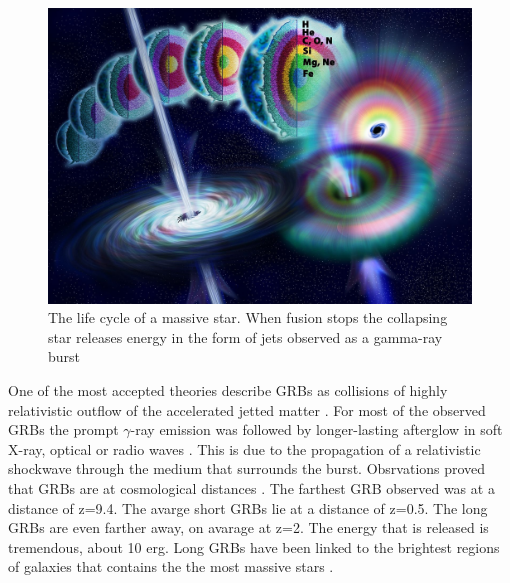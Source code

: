\documentclass[12pt, a4paper,titlepage]{article}
\numberwithin{equation}{section}
\numberwithin{figure}{section}
\begin{document}
\begin{figure}[H]
\centering
\includegraphics[width=130.0mm]{images/Gamma_ray_burst.jpg}
\caption{The life cycle of a massive star. When fusion stops the collapsing star releases energy in the form of jets observed as a gamma-ray burst}
\end{figure}

One of the most accepted theories describe GRBs as collisions of highly relativistic outflow of the accelerated jetted matter \cite{grb10}. For most of the observed GRBs the prompt $\gamma$-ray emission was followed by longer-lasting afterglow in soft X-ray, optical or radio waves \cite{grb11}. This is due to the propagation of a relativistic shockwave through the medium that surrounds the burst. Obsrvations proved that GRBs are at cosmological distances \cite{grb12}. The farthest GRB observed was at a distance of z=9.4. The avarge short GRBs lie at a distance of z=0.5. The long GRBs are even farther away, on avarage at z=2. The energy that is released is tremendous, about 10 erg. Long GRBs have been linked to the brightest regions of galaxies that contains the the most massive stars \cite{grb14}. %
\end{document}
